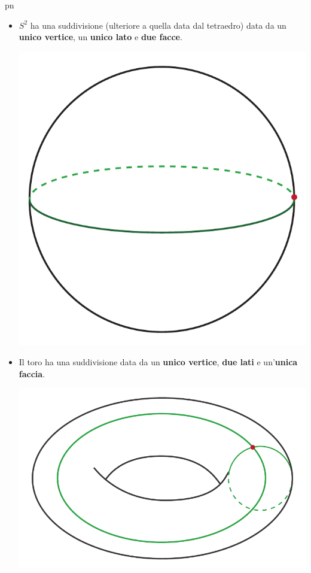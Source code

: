 \begin{example}{pn}~{}
	\begin{itemize}
		\item $S^2$ ha una suddivisione (ulteriore a quella data dal tetraedro) data da un \textcolor{redill}{\textbf{unico vertice}}, un \textcolor{greenill}{\textbf{unico lato}} e \textcolor{blueill}{\textbf{due facce}}.
			\begin{center}
				\includegraphics[trim=0cm 0cm 0cm 0cm, clip, scale=0.35]{images/spheresubdivision.pdf}
			\end{center}
		\item Il toro ha una suddivisione data da un \textcolor{redill}{\textbf{unico vertice}}, \textcolor{greenill}{\textbf{due lati}} e un'\textcolor{blueill}{\textbf{unica faccia}}.	
		\begin{center}
			\includegraphics[trim=0cm 0cm 0cm 0cm, clip, scale=0.35]{images/torussubdivision.pdf}
		\end{center}
	\end{itemize}
\end{example}
